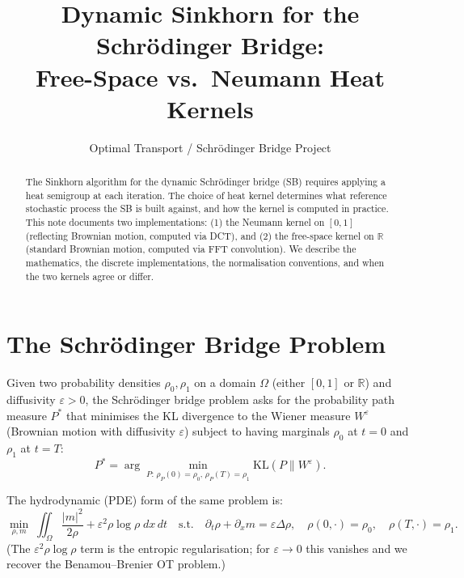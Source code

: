 \documentclass[11pt]{article}
\title{Dynamic Sinkhorn for the Schr\"odinger Bridge:\\
       Free-Space vs.\ Neumann Heat Kernels}
\author{Optimal Transport / Schr\"odinger Bridge Project}
\date{}
\newcommand{\eps}{\varepsilon}
\newcommand{\RR}{\mathbb{R}}
\theoremstyle{remark}
\begin{document}
\maketitle

\begin{abstract}
The Sinkhorn algorithm for the dynamic Schr\"odinger bridge (SB) requires applying a heat
semigroup at each iteration.
The choice of heat kernel determines what reference stochastic process the SB is built
against, and how the kernel is computed in practice.
This note documents two implementations:
(1) the Neumann kernel on $[0,1]$ (reflecting Brownian motion, computed via DCT), and
(2) the free-space kernel on $\RR$ (standard Brownian motion, computed via FFT
convolution).
We describe the mathematics, the discrete implementations, the normalisation
conventions, and when the two kernels agree or differ.
\end{abstract}

\section{The Schr\"odinger Bridge Problem}

Given two probability densities $\rho_0, \rho_1$ on a domain $\Omega$
(either $[0,1]$ or $\RR$) and diffusivity $\eps > 0$, the Schr\"odinger bridge
problem asks for the probability path measure $P^*$ that minimises the KL
divergence to the Wiener measure $W^\eps$ (Brownian motion with diffusivity $\eps$)
subject to having marginals $\rho_0$ at $t=0$ and $\rho_1$ at $t=T$:
\begin{equation}
  P^* = \arg\min_{P:\, \rho_P(0)=\rho_0,\, \rho_P(T)=\rho_1} \mathrm{KL}(P \| W^\eps).
\end{equation}

The hydrodynamic (PDE) form of the same problem is:
\begin{equation}
  \min_{\rho, m} \;\iint_{\Omega} \frac{|m|^2}{2\rho} + \eps^2 \rho \log \rho \; dx\, dt
  \quad \text{s.t.} \quad \partial_t \rho + \partial_x m = \eps \Delta\rho, \quad
  \rho(0,\cdot)=\rho_0, \quad \rho(T,\cdot)=\rho_1.
\end{equation}
(The $\eps^2 \rho \log \rho$ term is the entropic regularisation; for $\eps \to 0$ this
vanishes and we recover the Benamou--Brenier OT problem.)

\end{document}
